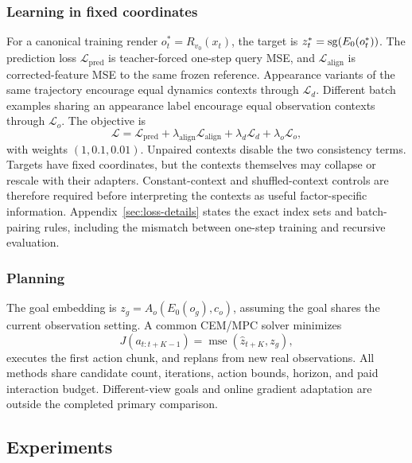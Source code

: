 \subsubsection{Learning in fixed coordinates}
For a canonical training render $o_t^*=R_{v_0}(x_t)$, the target is
$z_t^*=\operatorname{sg}(E_0(o_t^*))$. The prediction loss $\mathcal L_{\mathrm{pred}}$
is teacher-forced one-step query MSE, and $\mathcal L_{\mathrm{align}}$
is corrected-feature MSE to the same frozen reference. Appearance variants
of the same trajectory encourage equal dynamics contexts through
$\mathcal L_d$. Different batch examples sharing an appearance label
encourage equal observation contexts through $\mathcal L_o$.
The objective is
\begin{equation}
 \mathcal L=\mathcal L_{\mathrm{pred}}
 +\lambda_{\mathrm{align}}\mathcal L_{\mathrm{align}}
 +\lambda_d\mathcal L_d+\lambda_o\mathcal L_o,
 \label{eq:loss}
\end{equation}
with weights $(1,0.1,0.01)$. Unpaired contexts disable the two consistency
terms. Targets have fixed coordinates, but the contexts themselves may
collapse or rescale with their adapters. Constant-context and shuffled-context
controls are therefore required before interpreting the contexts as useful
factor-specific information. Appendix~\ref{sec:loss-details} states the
exact index sets and batch-pairing rules, including the mismatch between
one-step training and recursive evaluation.

\subsubsection{Planning}
The goal embedding is $z_g=A_o(E_0(o_g),c_o)$, assuming the goal shares
the current observation setting. A common CEM/MPC solver minimizes
\begin{equation}
 J(a_{t:t+K-1})=\operatorname{mse}(\hat z_{t+K},z_g),
 \label{eq:cost}
\end{equation}
executes the first action chunk, and replans from new real observations.
All methods share candidate count, iterations, action bounds, horizon,
and paid interaction budget. Different-view goals and online gradient
adaptation are outside the completed primary comparison.

\subsection{Experiments}
\label{sec:experiments}
